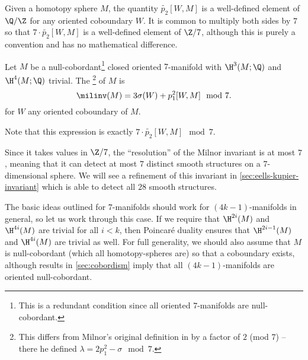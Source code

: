 \begin{remark}
	Given a homotopy sphere $M$, the quantity $\widetilde{p_2}[W,M]$ is a well-defined element of $\Q/\Z$ for any oriented coboundary $W$. It is common to multiply both sides by $7$ so that $7\cdot \widetilde{p_2}[W,M]$ is a well-defined element of $\Z/7$, although this is purely a convention and has no mathematical difference.
\end{remark}

\begin{definition}\label{def:milnor-invariant-7}
	Let $M$ be a null-cobordant\footnote{This is a redundant condition since all oriented $7$-manifolds are null-cobordant.}
	closed oriented $7$-manifold with $\H^3(M; \Q)$ and $\H^4(M; \Q)$ trivial. The \footnote{This differs from Milnor's original definition in \cite{milnor1956manifolds} by a factor of $2$ (mod 7) -- there he defined $\lambda=2p_1^2-\sigma \mod 7$.} of $M$ is
	\[
		\milinv(M) = 3\sigma(W)+p_1^2[W,M]\mod 7.
	\]
	for $W$ any oriented coboundary of $M$.
\end{definition}

Note that this expression is exactly $7\cdot \widetilde{p_2}[W,M]\mod 7$.

\begin{remark}
	Since it takes values in $\Z/7$, the ``resolution'' of the Milnor invariant is at most $7$, meaning that it can detect at most $7$ distinct smooth structures on a $7$-dimensional sphere. We will see a refinement of this invariant in \cref{sec:eells-kupier-invariant} which is able to detect all $28$ smooth structures.
\end{remark}

The basic ideas outlined for $7$-manifolds should work for $(4k-1)$-manifolds in general, so let us work through this case. If we require that $\H^{2i}(M)$ and $\H^{4i}(M)$ are trivial for all $i<k$, then Poincar\'e duality ensures that $\H^{2i-1}(M)$ and $\H^{4i}(M)$ are trivial as well. For full generality, we should also assume that $M$ is null-cobordant (which all homotopy-spheres are) so that a coboundary exists, although results in \cref{sec:cobordism} imply that all $(4k-1)$-manifolds are oriented null-cobordant.


